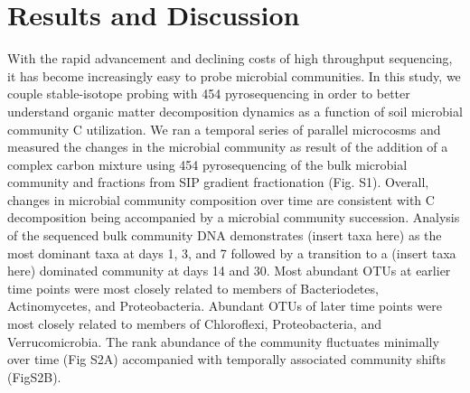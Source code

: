 \section{Results and Discussion}


With the rapid advancement and declining costs of high throughput sequencing, it has become increasingly easy to probe microbial communities.  In this study, we couple stable-isotope probing with 454 pyrosequencing in order to better understand organic matter decomposition dynamics as a function of soil microbial community C utilization. We ran a temporal series of parallel microcosms and measured the changes in the microbial community as result of the addition of a complex carbon mixture using 454 pyrosequencing of the bulk microbial community and fractions from SIP gradient fractionation (Fig. S1). Overall, changes in microbial community composition over time are consistent with C decomposition being accompanied by a microbial community succession. Analysis of the sequenced bulk community DNA demonstrates (insert taxa here) as the most dominant taxa at days 1, 3, and 7 followed by a transition to a (insert taxa here) dominated community at days 14 and 30. Most abundant OTUs at earlier time points were most closely related to members of Bacteriodetes, Actinomycetes, and Proteobacteria. Abundant OTUs of later time points were most closely related to members of Chloroflexi, Proteobacteria, and Verrucomicrobia.  The rank abundance of the community fluctuates minimally over time (Fig S2A) accompanied with temporally associated community shifts (FigS2B).   

